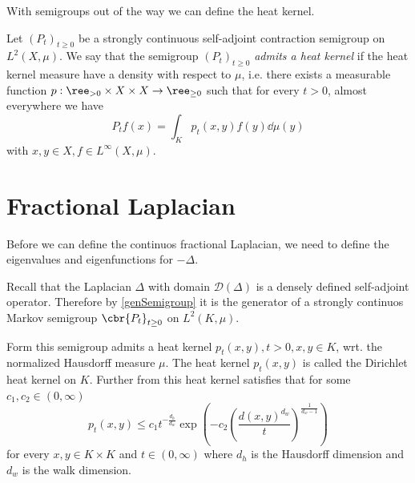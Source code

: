 With semigroups out of the way we can define the heat kernel.
\begin{defi}\label{heatKernel}
	Let $(P_t)_{t \geq 0}$ be a strongly continuous self-adjoint contraction semigroup on $L^2(X, \mu)$. We say that the semigroup $(P_t)_{t \geq 0}$ \emph{admits a heat kernel} if the heat kernel measure have a density with respect to $\mu$, i.e. there exists a measurable function $p: \ree_{> 0} \times X \times X \to \ree_{\geq 0}$ such that for every $t > 0$, almost everywhere we have
	\begin{equation}
		P_tf(x) = \int_{K}p_t(x,y)f(y) \dd \mu(y)
	\end{equation}
	with $x,y \in X, f \in L^{\infty}(X, \mu)$.
\end{defi}




\section{Fractional Laplacian}
Before we can define the continuos fractional Laplacian, we need to define the eigenvalues and eigenfunctions for $-\Delta$. 

Recall that the Laplacian $\Delta$ with domain $\mathcal{D}(\Delta)$ is a densely defined self-adjoint operator. Therefore by \cref{genSemigroup} it is the generator of a strongly continuos Markov semigroup $\cbr{P_t}_{t \geq 0}$ on $L^2(K, \mu)$. 

Form \cite[Lemma]{barlow}this semigroup admits a heat kernel $p_t(x,y), t > 0, x,y \in K$, wrt. the normalized Hausdorff measure $\mu$. The heat kernel $p_t(x,y)$ is called the Dirichlet heat kernel on $K$. Further from \cite[section 2.3]{Fabrice} this heat kernel satisfies that for some $c_1, c_2 \in (0, \infty)$ 
\begin{equation}\label{heatKernelBound}
	p_t(x,y) \leq c_1 t^{-\frac{d_h}{d_w}} \exp\left(-c_2 \left(\frac{d(x,y)^{d_w}}{t}\right)^{\frac{1}{d_w -1}}\right)
\end{equation}
for every $x,y \in K \times K$ and $t \in (0, \infty)$ where $d_h$ is the Hausdorff dimension and $d_w$ is the walk dimension. 

